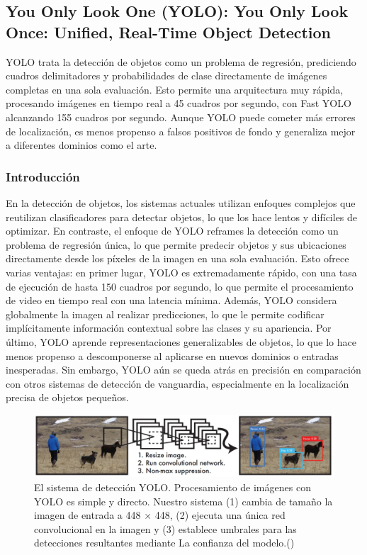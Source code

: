 \subsection{You Only Look One (YOLO): You Only Look Once: Unified, Real-Time Object Detection \citep*{tecnica4}}
YOLO trata la detección de objetos como un problema de regresión, prediciendo cuadros delimitadores y probabilidades de clase directamente de imágenes completas en una sola evaluación. Esto permite una arquitectura muy rápida, procesando imágenes en tiempo real a 45 cuadros por segundo, con Fast YOLO alcanzando 155 cuadros por segundo. Aunque YOLO puede cometer más errores de localización, es menos propenso a falsos positivos de fondo y generaliza mejor a diferentes dominios como el arte.
\subsubsection{Introducción}
En la detección de objetos, los sistemas actuales utilizan enfoques complejos que reutilizan clasificadores para detectar objetos, lo que los hace lentos y difíciles de optimizar. En contraste, el enfoque de YOLO reframes la detección como un problema de regresión única, lo que permite predecir objetos y sus ubicaciones directamente desde los píxeles de la imagen en una sola evaluación. Esto ofrece varias ventajas: en primer lugar, YOLO es extremadamente rápido, con una tasa de ejecución de hasta 150 cuadros por segundo, lo que permite el procesamiento de video en tiempo real con una latencia mínima. Además, YOLO considera globalmente la imagen al realizar predicciones, lo que le permite codificar implícitamente información contextual sobre las clases y su apariencia. Por último, YOLO aprende representaciones generalizables de objetos, lo que lo hace menos propenso a descomponerse al aplicarse en nuevos dominios o entradas inesperadas. Sin embargo, YOLO aún se queda atrás en precisión en comparación con otros sistemas de detección de vanguardia, especialmente en la localización precisa de objetos pequeños.

\begin{figure}[H]
	\begin{center}
		\includegraphics[width=1\textwidth]{2/figures/yolo1.jpeg}
		\caption{El sistema de detección YOLO. Procesamiento de imágenes
			con YOLO es simple y directo. Nuestro sistema (1) cambia de tamaño
			la imagen de entrada a 448 × 448, (2) ejecuta una única red convolucional en la imagen y (3) establece umbrales para las detecciones resultantes mediante
			La confianza del modelo.(\cite{tecnica4})}
	\end{center}
\end{figure}
